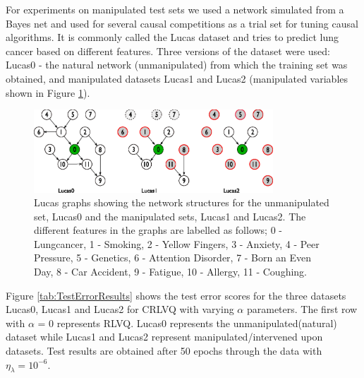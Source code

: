 \documentclass{esannV2}
\begin{document}
For experiments on manipulated test sets we used a network simulated from a Bayes net and used for several causal competitions as a trial set for tuning causal algorithms. It is commonly called the Lucas dataset\cite{12,13} and tries to predict lung cancer based on different features. Three versions of the dataset were used: Lucas0 - the natural network (unmanipulated) from which the training set was obtained, and manipulated datasets Lucas1 and Lucas2 (manipulated variables shown in Figure \ref{fig:lucasgraph}).

\begin{figure}[t]
	\centering
		\includegraphics[width=0.8\textwidth]{lucasgraph.eps}
	\caption{\footnotesize{Lucas graphs showing the network structures for the unmanipulated set, Lucas0 and the manipulated sets, Lucas1 and Lucas2. The different features in the graphs are labelled as follows; 0 - Lungcancer, 1 - Smoking, 2 - Yellow Fingers, 3 - Anxiety, 4 - Peer Pressure, 5 - Genetics, 6 - Attention Disorder, 7 - Born an Even Day, 8 - Car Accident, 9 - Fatigue, 10 - Allergy, 11 - Coughing.}}
	\label{fig:lucasgraph}
\end{figure}

Figure \ref{tab:TestErrorResults} shows the test error scores for the three datasets Lucas0, Lucas1 and Lucas2 for CRLVQ with varying $\alpha$ parameters. The first row with $\alpha$ = 0 represents RLVQ. Lucas0 represents the unmanipulated(natural) dataset while Lucas1 and Lucas2 represent manipulated/intervened upon datasets. Test results are obtained after 50 epochs through the data with $\eta_\lambda = 10^{-6}$.
\end{document}
